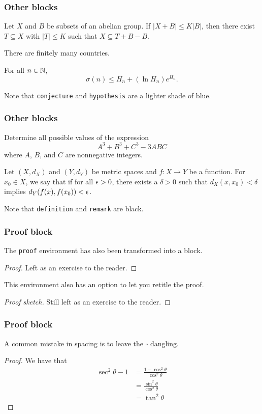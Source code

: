 \documentclass[mathserif]{beamer}
\begin{document}
\begin{frame}\frametitle{Other blocks}
	\begin{lemma}
		Let $X$ and $B$ be subsets of an abelian group. If $|X+B|\leq K|B|$, then there exist $T\subseteq X$ with $|T|\leq K$ such that $X\subseteq T+B-B$.
	\end{lemma}
	\begin{claim}
		There are finitely many countries.
	\end{claim}
	\begin{conjecture}
		For all $n\in\operatorname{\mathbb{N}}$,
		\[
			\sigma(n)\leq H_n+(\ln H_n)e^{H_n}.
		\]
	\end{conjecture}
	Note that \texttt{conjecture} and \texttt{hypothesis} are a lighter shade of blue.
\end{frame}

\begin{frame}\frametitle{Other blocks}
	\begin{problem}
		Determine all possible values of the expression
		\[
			A^3+B^3+C^3-3ABC
		\]
		where $A$, $B$, and $C$ are nonnegative integers.
	\end{problem}
	\begin{definition}[Continuity]
		Let $(X,d_X)$ and $(Y,d_Y)$ be metric spaces and $f\colon X\to Y$ be a function. For $x_0\in X$, we say that  if for all $\epsilon>0$, there exists a $\delta>0$ such that $d_X(x,x_0)<\delta$ implies $d_Y(f(x),f(x_0))<\epsilon$.
	\end{definition}
	Note that \texttt{definition} and \texttt{remark} are black.
\end{frame}

\begin{frame}\frametitle{Proof block}
	The \texttt{proof} environment has also been transformed into a block.
	\begin{proof}
		Left as an exercise to the reader.
	\end{proof}
	\pause
	This environment also has an option to let you retitle the proof.
	\begin{proof}[Proof sketch]
		Still left as an exercise to the reader.
	\end{proof}
\end{frame}

\begin{frame}\frametitle{Proof block}
	A common mistake in spacing is to leave the $\square$ dangling.
	\begin{proof}
		We have that
		\begin{align*}
			\sec^2\theta-1 &= \frac{1-\cos^2\theta}{\cos^2\theta} \\
			&= \frac{\sin^2\theta}{\cos^2\theta} \\
			&= \tan^2\theta
		\end{align*}
	\end{proof}
\end{frame}
\end{document}
